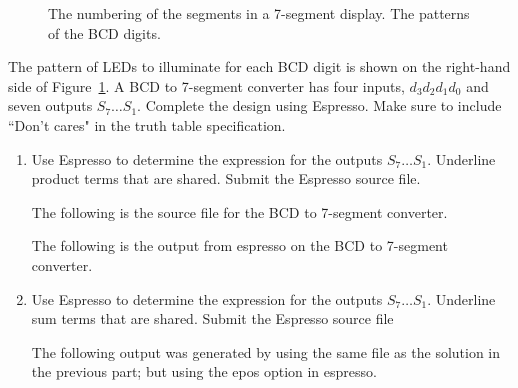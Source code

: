 \begin{enumerate}
\begin{figure}[ht]
\caption{The numbering of the segments in a 7-segment display.
The patterns of the BCD digits.}
\label{fig:BCD}
\end{figure}

The pattern of LEDs to illuminate for each BCD digit is shown on the 
right-hand side of Figure~\ref{fig:BCD}.  A BCD to 7-segment converter 
has four inputs, $d_3 d_2 d_1 d_0$ and seven outputs $S_7 \ldots S_1$.  
Complete the design using Espresso.  Make sure to include ``Don't cares" 
in the truth table specification. 
\begin{enumerate}
	\item Use Espresso to determine the \SOPmin expression for the outputs 
	$S_7 \ldots S_1$.  Underline product terms that are shared.
	Submit the Espresso source file.

\begin{solution}{
The following is the source file for the BCD to 7-segment converter.


The following is the output from espresso on the 
BCD to 7-segment converter.

} \end{solution}

	\item Use Espresso to determine the \POSmin expression for the outputs 
	$S_7 \ldots S_1$.  Underline sum terms that are shared.
	Submit the Espresso source file
\begin{solution} {
The following output was generated by using the same file
as the solution in the previous part; but using the epos
option in espresso.

}
\end{solution}
\end{enumerate}
\end{enumerate}
